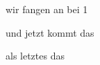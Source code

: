 \documentclass{beamer}
\begin{document}
\begin{frame}[t,shrink=65]
\begin{enumerate}
{\huge
    \item \alert<+> {wir fangen an bei 1}
    \item \alert<+> {und jetzt kommt das}
    \item \alert<+> {als letztes das}
}

\end{enumerate}
\end{frame}
\end{document}

